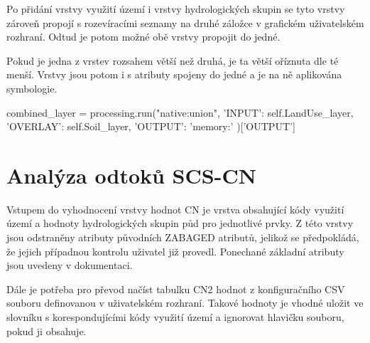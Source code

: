 \documentclass[a4paper,oneside,12pt]{book}
\begin{document}
\hspace{10mm}Po přidání vrstvy využití území i vrstvy hydrologických skupin se tyto vrstvy zároveň propojí s rozevíracími seznamy na druhé záložce v grafickém uživatelském rozhraní. Odtud je potom možné obě vrstvy propojit do jedné.

\hspace{10mm}Pokud je jedna z vrstev rozsahem větší než druhá, je ta větší oříznuta dle té menší. Vrstvy jsou potom i s atributy spojeny do jedné a je na ně aplikována symbologie.

\begin{pythoncode}[style=mypython, caption={Propojení vrstev využití území a HSP},label={kod:intersection}]
combined_layer = processing.run("native:union", {
                'INPUT': self.LandUse_layer,
                'OVERLAY': self.Soil_layer,
                'OUTPUT': 'memory:'
            })['OUTPUT']
\end{pythoncode}



\section{Analýza odtoků SCS-CN} \label{CN}
\hspace{10mm}Vstupem do vyhodnocení vrstvy hodnot CN je vrstva obsahující kódy využití území a hodnoty hydrologických skupin půd pro jednotlivé prvky. Z této vrstvy jsou odstraněny atributy původních ZABAGED atributů, jelikož se předpokládá, že jejich případnou kontrolu uživatel již provedl. Ponechané základní atributy jsou uvedeny v dokumentaci.

\hspace{10mm} Dále je potřeba pro převod načíst tabulku CN2 hodnot z konfiguračního CSV souboru definovanou v uživatelském rozhraní. Takové hodnoty je vhodné uložit ve slovníku s korespondujícími kódy využití území a ignorovat hlavičku souboru, pokud ji obsahuje.  \newline
\end{document}
